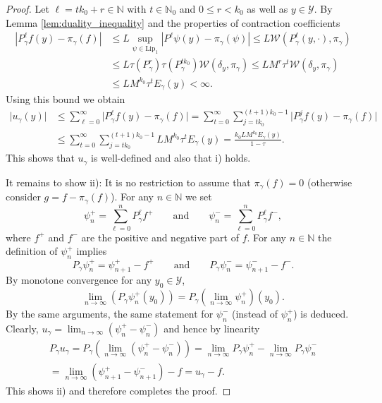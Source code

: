 \documentclass[10pt,a4paper]{amsart}
\newcommand{\N}{\mathbb{N}}
\newcommand{\cY}{\mathcal{Y}}
\begin{document}
\begin{proof}
	Let $\ell = tk_0 +r \in \N$ with $t \in \N_0$ and $0 \leq r < k_0$ as well as $y \in \cY$. 
	By Lemma \ref{lem:duality_inequality} and the properties of contraction coefficients   
	\begin{align*}
		\left\vert P_\gamma^\ell f(y) - \pi_\gamma(f)  \right\vert &\leq L \sup_{\psi \in \text{Lip}_1}\left\vert P^\ell \psi(y) - \pi_\gamma(\psi) \right\vert 
		\le L  \mathcal{W}(P_\gamma^{\ell}(y, \cdot), \pi_\gamma ) \\
		&\leq L \tau(P_\gamma^r) \tau(P_\gamma^{tk_0}) \mathcal{W}(\delta_y, \pi_\gamma)
		\leq L M^r \tau^{t} \mathcal{W}(\delta_y, \pi_\gamma) \\
		&\leq L M^{k_0} \tau^{t} E_\gamma(y) < \infty.
	\end{align*}
	Using this bound we obtain 
	\begin{align*}
		\vert u_\gamma(y )\vert  &\le \sum_{\ell=0}^\infty \vert P_\gamma^\ell f(y) - \pi_\gamma(f) \vert =
		\sum_{t=0}^\infty \sum_{j= tk_0 }^{(t+1) k_0-1 } \vert P_\gamma^{j} f(y) - \pi_\gamma(f) \vert\\
		&\leq \sum_{t=0}^\infty \sum_{j= tk_0 }^{(t+1)k_0 -1} L M^{k_0} \tau^{t} E_\gamma(y) 
		= \frac{k_0L M^{k_0} E_\gamma(y)}{1- \tau}.
	\end{align*}
	This shows that $u_\gamma$ is well-defined and also that i) holds. 
	
	
	It remains to show ii): 
	It is no restriction to assume that $\pi_\gamma (f) =0$ (otherwise consider $g = f- \pi_\gamma(f)$). 
	For any $n \in \N$ we set 
	\[
	\psi_n^+ = \sum_{\ell=0}^n P^\ell_\gamma f^+  \qquad\text{and}\qquad \psi_n^- = \sum_{\ell=0}^n P_\gamma^\ell f^-,
	\]
	where $f^+$ and $f^-$ are the positive and negative part of $f$. 
	For any $n \in \N$  the definition of $\psi_n^+$ implies
	\[
	P_\gamma \psi_n^+ = \psi_{n+1}^+ - f^+ \qquad\text{and}\qquad P_\gamma \psi_n^- = \psi_{n+1}^- - f^-.
	\]
	By monotone convergence for any $y_0 \in \cY$, 
	\[
	\lim_{n \to \infty} \left( P_\gamma \psi_n^+ (y_0) \right) = P_\gamma \left( \lim_{n \to \infty} \psi_n^+\right)  (y_0).
	\]
	By the same arguments, the same statement for $\psi_n^-$ (instead of $\psi_n^+$) is deduced.
	Clearly, $u_\gamma = \lim_{n \to \infty} (\psi_n^+ - \psi_n^-)$ and hence by linearity 
	\begin{align*}
		P_\gamma u_\gamma = P_\gamma \left( \lim_{n \to \infty} (\psi_n^+ - \psi_n^-) \right) = \lim_{n \to \infty} P_\gamma \psi_n^+  - \lim_{n \to \infty} P_\gamma \psi_n^- \\
		= \lim_{n \to \infty} \left(\psi_{n+1}^+ - \psi_{n+1}^-\right) - f
		= u_\gamma -f.
	\end{align*}
	This shows ii) and therefore completes the proof.
\end{proof}
\end{document}
